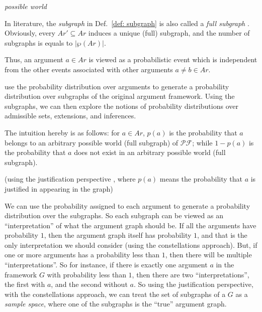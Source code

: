 \begin{remark}
    \textit{possible world}  



    In literature, 
    the \textit{subgraph} in Def.~\ref{def: subgraph} is also called a \textit{full subgraph} \cite{Hun2013,Dod.Wol2014}.
    Obviously, 
    every $Ar' \subseteq Ar$ induces a unique (full) subgraph, 
    and the number of subgraphs is equals to $|\wp(Ar)|$.
\end{remark}



Thus, 
an argument $a \in Ar$ is viewed as a probabilistic event which is independent from the other events associated with other arguments 
$a \not=b \in Ar$.






use the probability distribution over arguments to generate a probability distribution over subgraphs of the original argument framework. 
% 
Using the subgraphs, 
we can then explore the notions of probability distributions over admissible sets, extensions, and inferences.





The intuition hereby is as follows: 
for $a \in Ar$, 
$p(a)$ is the probability that $a$ belongs to an arbitrary possible world (full subgraph) of $\mathcal{PF}$; 
while $1-p(a)$ is the probability that $a$ does not exist in an arbitrary possible world (full subgraph). 


(using the justification perspective \cite{Hun2012}, 
where $p(a)$ means the probability that $a$ is justified in appearing in the graph) 



\vspace{1.5em}


We can use the probability assigned to each argument to generate a probability distribution over the subgraphs. 
So each subgraph can be viewed as an ``interpretation'' of what the argument graph should be. 
If all the arguments have probability $1$, 
then the argument graph itself has probability $1$, 
and that is the only interpretation we should consider (using the constellations approach). 
But, if one or more arguments has a probability less than $1$, 
then there will be multiple ``interpretations''. 
% 
So for instance, 
if there is exactly one argument $a$ in the framework $G$ with probability less than $1$, 
then there are two “interpretations”, 
the first with $a$, 
and the second without $a$. 
% 
So using the justification perspective, 
with the constellations approach, 
we can treat the set of subgraphs of a $G$ as a \textit{sample space}, 
where one of the subgraphs is the ``true'' argument graph.


